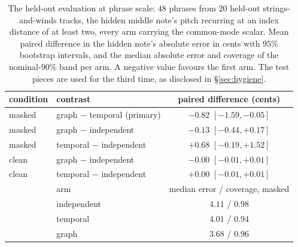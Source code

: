 \begin{table}[t]\centering
\caption{The held-out evaluation at phrase scale: $48$ phrases from $20$
held-out strings-and-winds tracks, the hidden middle note's pitch
recurring at an index distance of at least two, every arm carrying the
common-mode scalar. Mean paired difference in the hidden note's absolute
error in cents with $95\%$ bootstrap intervals, and the median absolute
error and coverage of the nominal-$90\%$ band per arm. A negative value
favours the first arm. The test pieces are used for the third time, as
disclosed in \S\ref{sec:hygiene}.}
\label{tab:phase3-heldout}
\footnotesize
\begin{tabular}{@{}llc@{}}
\toprule
condition & contrast & paired difference (cents) \\
\midrule
masked & graph $-$ temporal (primary) & $-0.82$ $[-1.59, -0.05]$ \\
masked & graph $-$ independent & $-0.13$ $[-0.44, +0.17]$ \\
masked & temporal $-$ independent & $+0.68$ $[-0.19, +1.52]$ \\
clean & graph $-$ independent & $-0.00$ $[-0.01, +0.01]$ \\
clean & temporal $-$ independent & $+0.00$ $[-0.01, +0.01]$ \\
\midrule
& arm & median error / coverage, masked \\
\midrule
& independent & $4.11$ / $0.98$ \\
& temporal & $4.01$ / $0.94$ \\
& graph & $3.68$ / $0.96$ \\
\bottomrule
\end{tabular}
\end{table}

